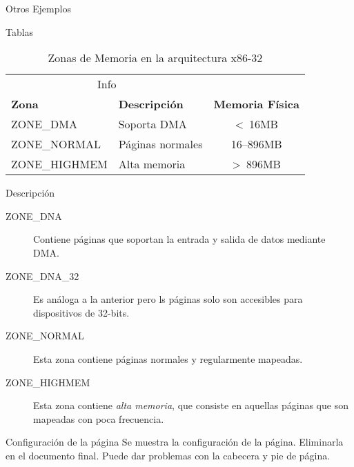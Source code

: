 \documentclass{article}
\theoremstyle{theorem-style}  %
\theoremstyle{definition}
\theoremstyle{example-style}
\begin{document}
\begin{section}{Otros Ejemplos}

\begin{subsection}{Tablas}

\lipsum[1]

\begin{table}[ht]
\caption{Zonas de Memoria en la arquitectura x86-32}
\kern 1mm                                  %
\centering \begin{tabular}{@{}llc@{}}
\toprule
\multicolumn{2}{c}{Info}                                            \\
\cmidrule(r){1-2}
\textbf{Zona} & \textbf{Descripción}   & \textbf{Memoria Física}    \\ 
\midrule
ZONE\_DMA     & Soporta DMA            & \textless \ 16MB           \\ 
ZONE\_NORMAL  & Páginas normales       & 16–896MB                   \\
ZONE\_HIGHMEM & Alta memoria           & \textgreater \ 896MB       \\ 
\bottomrule
\end{tabular}
\label{table:memoria-x86-32}
\end{table}

\end{subsection}

\begin{subsection}{Descripción}

\begin{description}
\item[ZONE\_DNA] Contiene páginas que soportan la entrada y salida de datos mediante DMA.
\item[ZONE\_DNA\_32] Es análoga a la anterior pero ls páginas solo son accesibles para
dispositivos de 32-bits.
\item[ZONE\_NORMAL] Esta zona contiene páginas normales y regularmente mapeadas.
\item[ZONE\_HIGHMEM] Esta zona contiene \textit{alta memoria}, que consiste en
 aquellas páginas que son mapeadas con poca frecuencia.
\end{description}

\end{subsection}

\pagebreak

\begin{subsection}{Configuración de la página}
Se muestra la configuración de la página. Eliminarla en el documento final. 
Puede dar problemas con la cabecera y pie de página.

\centering\layout
\end{subsection}

\end{section}
\end{document}
